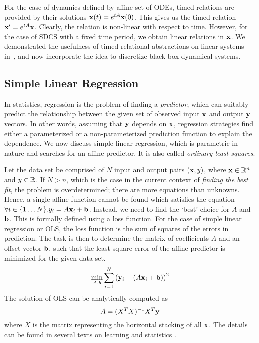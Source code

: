For the case of dynamics defined by affine set of ODEs, timed
relations are provided by their solutions $\mathbf{x}(t) = e^{tA}\mathbf{x}(0)$.
This gives us the timed relation $\mathbf{x}' = e^{tA}\mathbf{x}$. Clearly, the
relation is non-linear with respect to time. However, for the case of
SDCS with a fixed time period, we obtain linear relations in $\mathbf{x}$.
We demonstrated the usefulness of timed relational abstractions on
linear systems in~\cite{zutshi2012timed}, and now incorporate the idea
to discretize black box dynamical systems.


\subsection{Simple Linear Regression}


In statistics, regression is the problem of finding a
\textit{predictor}, which can suitably predict the relationship
between the given set of observed input $\mathbf{x}$ and output $\mathbf{y}$ vectors.
In other words, assuming that $\mathbf{y}$ depends on $\mathbf{x}$, regression
strategies find either a parameterized or a non-parameterized
prediction function to explain the dependence. We now discuss simple
linear regression, which is parametric in nature and searches for an
affine predictor. It is also called \textit{ordinary least squares}.


Let the data set be comprised of $N$ input and output pairs $(\mathbf{x},
y)$, where $\mathbf{x}\in\mathbb{R}^n$ and $y\in\mathbb{R}$. If $N>n$, which is
the case in the current context of \textit{finding the best fit}, the
problem is overdetermined; there are more equations than
unknowns. Hence, a single affine function cannot be found which
satisfies the equation $\forall i\in\{1\ldots N\}. y_i = A\mathbf{x}_i + \mathbf{b}$. Instead, we
need to find the `best' choice for $A$ and $\mathbf{b}$. This is formally
defined using a loss function. For the case of simple linear
regression or OLS, the loss function is the sum of squares of the
errors in prediction.  The task is then to determine the matrix of
coefficients $A$ and an offset vector $\mathbf{b}$, such that the least
square error of the affine predictor is minimized for the given data
set.
\[
    \min_{A, b}\displaystyle\sum_{i=1}^{N}{\left(\mathbf{y}_i - (A\mathbf{x}_i + \mathbf{b})\right)^2}
\]
The solution of OLS can be analytically computed as
\[ A = (X^TX)^{-1}X^T\mathbf{y}\]
where $X$ is the matrix representing the horizontal stacking of all $\mathbf{x}$.
The details can be found in several texts on learning and statistics
\cite{friedman2001elements}.

